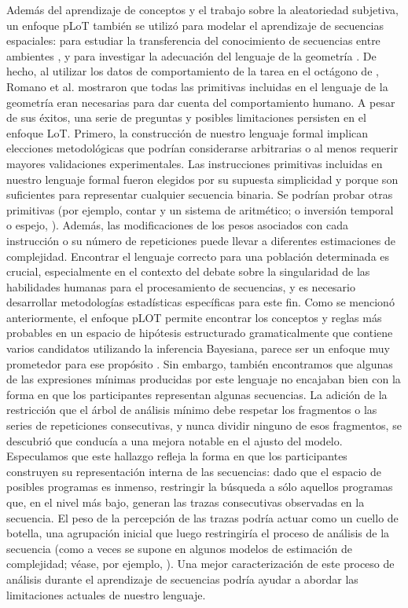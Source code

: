 Además del aprendizaje de conceptos y el trabajo sobre la aleatoriedad subjetiva, un enfoque pLoT también se utilizó para modelar el aprendizaje de secuencias espaciales: para estudiar la transferencia del conocimiento de secuencias entre ambientes \cite{yildirim2015learning}, y para investigar la adecuación del lenguaje de la geometría \cite{romano2018bayesian}. De hecho, al utilizar los datos de comportamiento de la tarea en el octágono de \cite{amalric2017language}, Romano et al. \cite{romano2018bayesian} mostraron que todas las primitivas incluidas en el lenguaje de la geometría eran necesarias para dar cuenta del comportamiento humano. A pesar de sus éxitos, una serie de preguntas y posibles limitaciones persisten en el enfoque LoT. Primero, la construcción de nuestro lenguaje formal implican elecciones metodológicas que podrían considerarse arbitrarias o al menos requerir mayores validaciones experimentales. Las instrucciones primitivas incluidas en nuestro lenguaje formal fueron elegidos por su supuesta simplicidad y porque son suficientes para representar cualquier secuencia binaria. Se podrían probar otras primitivas (por ejemplo, contar y un sistema de aritmético; o inversión temporal o espejo, \cite{f10}). Además, las modificaciones de los pesos asociados con cada instrucción o su número de repeticiones puede llevar a diferentes estimaciones de complejidad. Encontrar el lenguaje correcto para una población determinada es crucial, especialmente en el contexto del debate sobre la singularidad de las habilidades humanas para el procesamiento de secuencias, y es necesario desarrollar metodologías estadísticas específicas para este fin. Como se mencionó anteriormente, el enfoque pLOT permite encontrar los conceptos y reglas más probables en un espacio de hipótesis estructurado gramaticalmente que contiene varios candidatos utilizando la inferencia Bayesiana, parece ser un enfoque muy prometedor para ese propósito \cite{goodman2008rational,piantadosi2016four,romano2018bayesian}. Sin embargo, también encontramos que algunas de las expresiones mínimas producidas por este lenguaje no encajaban bien con la forma en que los participantes representan algunas secuencias. La adición de la restricción que el árbol de análisis mínimo debe respetar los fragmentos o las series de repeticiones consecutivas, y nunca dividir ninguno de esos fragmentos, se descubrió que conducía a una mejora notable en el ajusto del modelo. Especulamos que este hallazgo refleja la forma en que los participantes construyen su representación interna de las secuencias: dado que el espacio de posibles programas es inmenso, restringir la búsqueda a sólo aquellos programas que, en el nivel más bajo, generan las trazas consecutivas observadas en la secuencia. El peso de la percepción de las trazas podría actuar como un cuello de botella, una agrupación inicial que luego restringiría el proceso de análisis de la secuencia (como a veces se supone en algunos modelos de estimación de complejidad; véase, por ejemplo, \cite{f98}). Una mejor caracterización de este proceso de análisis durante el aprendizaje de secuencias podría ayudar a abordar las limitaciones actuales de nuestro lenguaje.

